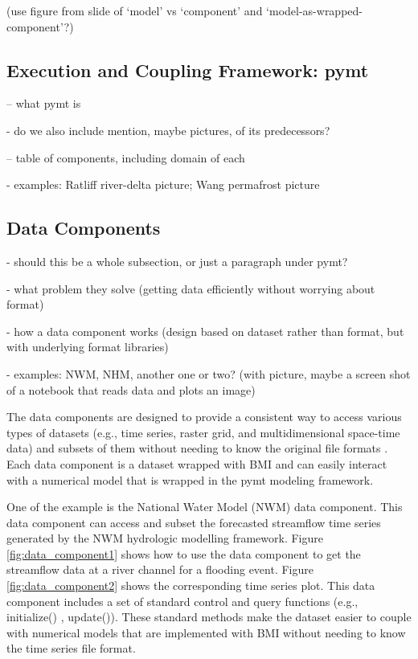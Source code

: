 \documentclass[12pt]{amsart}
\begin{document}
(use figure from slide of `model' vs `component' and `model-as-wrapped-component'?)

\subsection{Execution and Coupling Framework: pymt}

-- what pymt is

- do we also include mention, maybe pictures, of its predecessors?

-- table of components, including domain of each

- examples: Ratliff river-delta picture; Wang permafrost picture

\subsection{Data Components}

- should this be a whole subsection, or just a paragraph under pymt?

- what problem they solve (getting data efficiently without worrying about format)

- how a data component works (design based on dataset rather than format, but with underlying format libraries)

- examples: NWM, NHM, another one or two? (with picture, maybe a screen shot of a notebook that reads data and plots an image)


The data components are designed to provide a consistent way to access various types of datasets (e.g., time series, raster grid, and multidimensional space-time data) and subsets of them without needing to know the original file formats . Each data component is a dataset wrapped with BMI and can easily interact with a numerical model that is wrapped in the pymt modeling framework. 

One of the example is the National Water Model (NWM) data component. This data component can access and subset the forecasted streamflow time series generated by the NWM hydrologic modelling framework. Figure \ref{fig:data_component1} shows how to use the data component to get the streamflow data at a river channel for a flooding event. Figure \ref{fig:data_component2} shows the corresponding time series plot. This data component includes a set of standard control and query functions (e.g.,  initialize() , update()). These standard methods make the dataset easier to couple with numerical models that are implemented with BMI without needing to know the time series file format.
\end{document}
